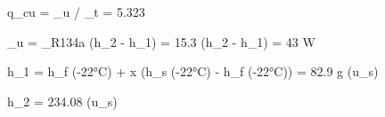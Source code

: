 q_cu = _u / _t = 5.323  

_u = _R134a (h_2 - h_1) = 15.3 (h_2 - h_1) = 43 W  

h_1 = h_f (-22°C) + x (h_s (-22°C) - h_f (-22°C))  
= 82.9 g (u_s)  

h_2 = 234.08 (u_s)